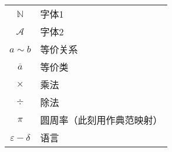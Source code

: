 \documentclass[UTF8]{ctexart}
\begin{document}
\begin{appendix}
\begin{tabular}{c  l}
    $\mathbb{N}$&字体1\\

    $\mathscr{A}$&字体2\\

    $a \sim b$&等价关系\\

    $\overline{a}$&等价类\\

    $\times$&乘法\\

    $\div$&除法\\

    $\pi$&圆周率（此刻用作典范映射）\\

    $\varepsilon - \delta$&语言
\end{tabular}

\end{appendix}
\end{document}

